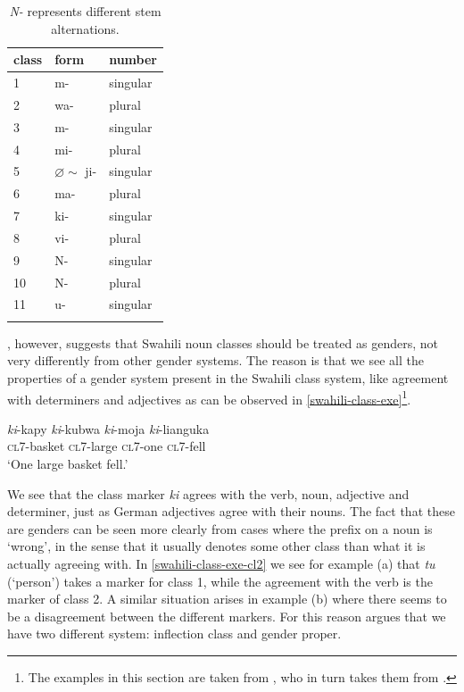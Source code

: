 \begin{table}[!htpb]
  \centering
  \begin{tabular}{lll}
    \lsptoprule
    class & form                   & number   \\
    \midrule
    1     & m-                     & singular \\
    2     & wa-                    & plural   \\
    3     & m-                     & singular \\
    4     & mi-                    & plural   \\
    5     & $\varnothing \sim$ ji- & singular \\
    6     & ma-                    & plural   \\
    7     & ki-                    & singular \\
    8     & vi-                    & plural   \\
    9     & N-                     & singular \\
    10    & N-                     & plural   \\
    11    & u-                     & singular \\
    \lspbottomrule
  \end{tabular}\caption{\textit{N-} represents different stem alternations.}\label{tab:swahili-classes}
\end{table}

\textcite{Corbett.1991}, however, suggests that Swahili noun classes should be treated as genders, not very differently from other gender systems. The reason is that we see all the properties of a gender system present in the Swahili class system, like agreement with determiners and adjectives as can be observed in \ref{swahili-class-exe}\footnote{The examples in this section are taken from \autocite{Corbett.1991}, who in turn takes them from \autocite[p. 159-183]{Welmers.1973}.}.

\begin{exe}
    \ex \label{swahili-class-exe}
    \gll \textit{ki}-kapy \textit{ki}-kubwa \textit{ki}-moja \textit{ki}-lianguka\\
    {} \textsc{cl7}-basket \textsc{cl7}-large \textsc{cl7}-one \textsc{cl7}-fell\\
    \glt `One large basket fell.'
\end{exe}

We see that the class marker \textit{ki} agrees with the verb, noun, adjective and determiner, just as German adjectives agree with their nouns. The fact that these are genders can be seen more clearly from cases where the prefix on a noun is `wrong', in the sense that it usually denotes some other class than what it is actually agreeing with. In \ref{swahili-class-exe-cl2} \autocite[p. 45]{Corbett.1991} we see for example (a) that \textit{tu} (`person') takes a marker for class 1, while the agreement with the verb is the marker of class 2. A similar situation arises in example (b) where there seems to be a disagreement between the different markers. For this reason \textcite{Corbett.1991} argues that we have two different system: inflection class and gender proper.

